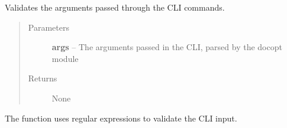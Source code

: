 \documentclass[letterpaper,12pt,english]{sphinxmanual}
\begin{document}
\begin{fulllineitems}
\label{implementation/utils:scrapple.utils.exceptions.handle_exceptions}
Validates the arguments passed through the CLI commands.
\begin{quote}\begin{description}
\item[{Parameters}] \leavevmode
\textbf{args} -- The arguments passed in the CLI, parsed by the docopt module

\item[{Returns}] \leavevmode
None

\end{description}\end{quote}

\end{fulllineitems}


The function uses regular expressions to validate the CLI input.
\end{document}
